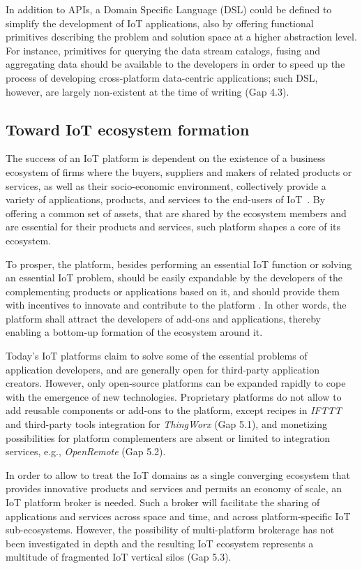 \documentclass[preprint,10pt,5p]{elsarticle}
\begin{document}
In addition to APIs, a Domain Specific Language (DSL) could be defined 
to simplify the development of IoT applications, also by offering functional 
primitives describing the problem and solution space at a higher abstraction level. 
For instance, primitives for querying the data stream catalogs, fusing and 
aggregating data should be available to the developers in order to speed up the
process of developing cross-platform data-centric applications; such DSL, however,
are largely non-existent at the time of writing (Gap 4.3).

\subsection{Toward IoT ecosystem formation}
\label{sec:gap_ecosystem}

The success of an IoT platform is dependent on the existence of a business
ecosystem of firms where the buyers, suppliers and makers of related products or
services, as well as their socio-economic environment, collectively provide a 
variety of applications, products, and services to the end-users of IoT~\cite{Mazhelis2012}. 
By offering a common set of assets, that are shared by the ecosystem members and
are essential for their products and services, such platform shapes a core of
its ecosystem. 

To prosper, the platform, besides performing an essential IoT function or
solving an essential IoT problem, should be easily expandable by the developers
of the complementing products or applications based on it, and should provide
them with incentives to innovate and contribute to the platform
\cite{Gawer2008}. In other words, the platform shall attract the developers of
add-ons and applications, thereby enabling a bottom-up formation of the ecosystem around it.

Today's IoT platforms claim to solve some of the essential problems of
application developers, and are generally open for third-party application
creators. However, only open-source platforms can be expanded rapidly to cope
with the emergence of new technologies. Proprietary platforms do not allow to
add reusable components or add-ons  to the platform, except recipes in 
\emph{IFTTT} and  third-party tools integration for 
\emph{ThingWorx} (Gap 5.1), and monetizing possibilities for platform complementers 
are absent or limited to integration services, e.g., \emph{OpenRemote} (Gap 5.2).

In order to allow to treat the IoT domains as a single converging
ecosystem that provides innovative products and services and permits
an economy of scale, an IoT platform broker is needed. 
Such a broker will facilitate the sharing of applications and services
across space and time, and across platform-specific IoT sub-ecosystems.
However, the possibility of multi-platform brokerage has not been
investigated in depth and the resulting IoT ecosystem represents a
multitude of fragmented IoT vertical silos (Gap 5.3).
\end{document}
